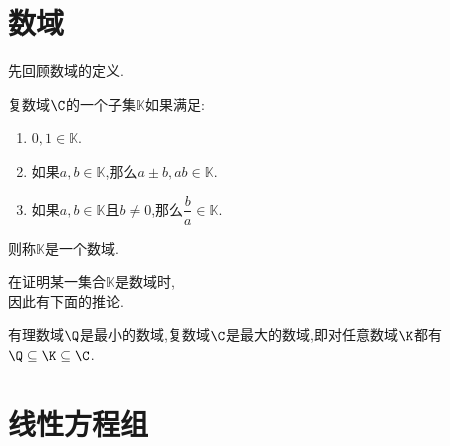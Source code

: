 \documentclass{ctexart}
\title{\tbf{Mid-Term Exam Review}}
\author{夜未央}
\begin{document}
\maketitle
\section{数域}
先回顾数域的定义.
\begin{definition}[数域]
    复数域$\C$的一个子集$\mathbb{K}$如果满足:
    \begin{enumerate}
        \item $0,1\in\mathbb{K}$.
        \item 如果$a,b\in\mathbb{K}$,那么$a\pm b,ab\in\mathbb{K}$.
        \item 如果$a,b\in\mathbb{K}$且$b\neq0$,那么$\dfrac ba\in\mathbb{K}$.
    \end{enumerate}
    则称$\mathbb{K}$是一个数域.
\end{definition}
在证明某一集合$\mathbb{K}$是数域时,\\
\indent 因此有下面的推论.
\begin{lemma}[关于数域的推论]
    有理数域$\Q$是最小的数域,复数域$\C$是最大的数域,即对任意数域$\K$都有$\Q\subseteq\K\subseteq\C$.
\end{lemma}
\section{线性方程组}
\end{document}
